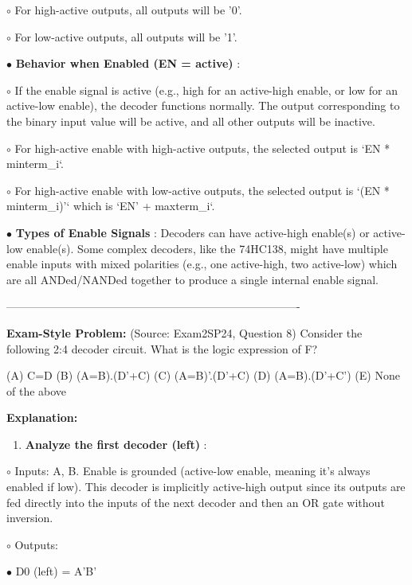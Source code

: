 \documentclass{article}
\begin{document}
    $\circ$ For high-active outputs, all outputs will be '0'.

    $\circ$ For low-active outputs, all outputs will be '1'.

$\bullet$ \textbf{Behavior when Enabled (EN = active)} :

    $\circ$ If the enable signal is active (e.g., high for an active-high enable, or low for an active-low enable), the decoder functions normally. The output corresponding to the binary input value will be active, and all other outputs will be inactive.

    $\circ$ For high-active enable with high-active outputs, the selected output is `EN * minterm\_i`.

    $\circ$ For high-active enable with low-active outputs, the selected output is `(EN * minterm\_i)'` which is `EN' + maxterm\_i`.

$\bullet$ \textbf{Types of Enable Signals} : Decoders can have active-high enable(s) or active-low enable(s). Some complex decoders, like the 74HC138, might have multiple enable inputs with mixed polarities (e.g., one active-high, two active-low) which are all ANDed/NANDed together to produce a single internal enable signal.

\-------------------------------------------------------------------------------- 

\textbf{Exam-Style Problem:} (Source: Exam2SP24, Question 8) Consider the following 2:4 decoder circuit. What is the logic expression of F?

\begin{center}

\end{center}

(A) C=D (B) (A=B).(D'+C) (C) (A=B)'.(D'+C) (D) (A=B).(D'+C') (E) None of the above

\textbf{Explanation:}

\begin{enumerate}
\item \textbf{Analyze the first decoder (left)} :

\end{enumerate}
    $\circ$ Inputs: A, B. Enable is grounded (active-low enable, meaning it's always enabled if low). This decoder is implicitly active-high output since its outputs are fed directly into the inputs of the next decoder and then an OR gate without inversion.

    $\circ$ Outputs:

        $\bullet$ D0 (left) = A'B'
\end{document}

